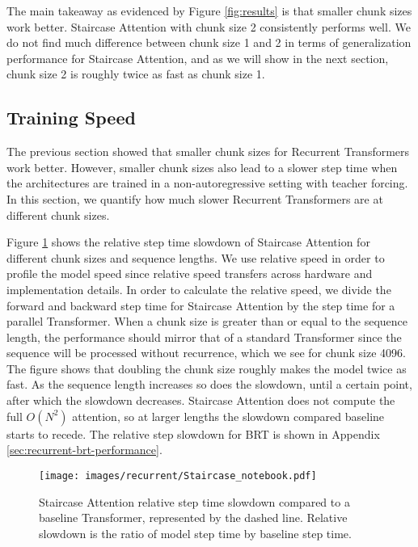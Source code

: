     The main takeaway as evidenced by Figure \ref{fig:results} is that smaller chunk sizes work better. Staircase Attention with chunk size 2 consistently performs well. We do not find much difference between chunk size 1 and 2 in terms of generalization performance for Staircase Attention, and as we will show in the next section, chunk size 2 is roughly twice as fast as chunk size 1.
    
    
    \subsection{Training Speed} \label{sec:recurrent-training-speed}
    The previous section showed that smaller chunk sizes for Recurrent Transformers work better. However, smaller chunk sizes also lead to a slower step time when the architectures are trained in a non-autoregressive setting with teacher forcing. In this section, we quantify how much slower Recurrent Transformers are at different chunk sizes.
    
    Figure \ref{fig:speed} shows the relative step time slowdown of Staircase Attention for different chunk sizes and sequence lengths. We use relative speed in order to profile the model speed since relative speed transfers across hardware and implementation details. In order to calculate the relative speed, we divide the forward and backward step time for Staircase Attention by the step time for a parallel Transformer.  When a chunk size is greater than or equal to the sequence length, the performance should mirror that of a standard Transformer since the sequence will be processed without recurrence, which we see for chunk size 4096. The figure shows that doubling the chunk size roughly makes the model twice as fast. As the sequence length increases so does the slowdown, until a certain point, after which the slowdown decreases. Staircase Attention does not compute the full $O(N^2)$ attention, so at larger lengths the slowdown compared baseline starts to recede. The relative step slowdown for BRT is shown in Appendix \ref{sec:recurrent-brt-performance}.
    
    
    \begin{figure}
        \centering
        \texttt{[image: images/recurrent/Staircase\_notebook.pdf]}
        \caption{Staircase Attention relative step time slowdown compared to a baseline Transformer, represented by the dashed line. Relative slowdown is the ratio of model step time by baseline step time.}
        \label{fig:speed}
    \end{figure}
    

